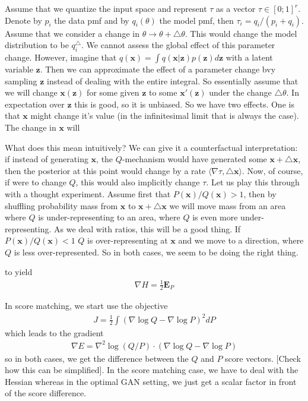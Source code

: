 \documentclass{article}
\newcommand{\Edata}{\E_{P}}
\newcommand{\E}{{\mathbf E}}
\newcommand{\z}{{\mathbf z}}
\newcommand{\x}{{\mathbf x}}
\begin{document}
Assume that we quantize the input space and represent $\tau$ as a vector $\tau \in [0;1]^r$. Denote by $p_i$ the data pmf and by $q_i(\theta)$ the model pmf, then $\tau_i = q_i/(p_i+q_i)$. Assume that we consider a change in $\theta \to \theta + \triangle \theta$. This would change the model distribution to be $q_i^{\triangle}$. We cannot assess the global effect of this parameter change. However, imagine that $q(\x) = \int q(\x|\z) p(\z) d\z$ with a latent variable $\z$. Then we can approximate the effect of a parameter change bvy sampling $\z$ instead of dealing with the entire integral. So essentially assume that we will change $\x(\z)$ for some given $\z$ to some $\x'(\z)$ under the change $\triangle \theta$. In expectation over $\z$ this is good, so it is unbiased. So we have two effects. One is that $\x$ might change it's value (in the infinitesimal limit that is always the case). The change in $\x$ will 

\newpage


What does this mean intuitively? We can give it a counterfactual interpretation: if instead of generating $\x$, the $Q$-mechanism would have generated some $\x + \triangle \x$, then the posterior at this point would change by a rate $\langle \nabla \tau, \triangle \x \rangle$.   Now, of course, if were to change $Q$, this would also implicitly change $\tau$. Let us play this through with a thought experiment. Assume first that $P(\x)/Q(\x)>1$, then by shuffling probability mass from $\x$ to $\x + \triangle \x$ we will move mass from an area where $Q$ is under-representing to an area, where $Q$ is even more under-representing.  As we deal with ratios, this will be a good thing. If $P(\x)/Q(\x)<1$ $Q$ is over-representing at $\x$ and we move to a direction, where $Q$ is less over-represented. So in both cases, we seem to be doing the right thing. 

\newpage

to yield
\begin{align}
\nabla H = \frac12 \Edata 
\end{align}

In score matching, we start use the objective 
\begin{align}
J = \frac12 \int \left( \nabla \log Q - \nabla \log P\right)^2 dP 
\end{align}
which leads to the gradient 
\begin{align}
\nabla E = \nabla^2 \log (Q/P) \cdot (\nabla \log Q - \nabla \log P)
\end{align}
so in both cases, we get the difference between the $Q$ and $P$ score vectors. [Check how this can be simplified]. In the score matching case, we have to deal with the Hessian whereas in the optimal GAN setting, we just get a scalar factor in front of the score difference. \\
\end{document}
